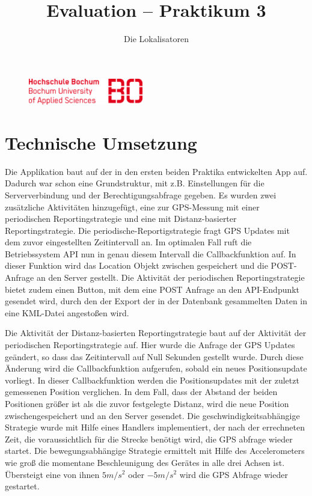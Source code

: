 

\title{Evaluation -- Praktikum 3}
\author{Die Lokalisatoren}

\ihead{}
\chead{}
\ohead{}
\ifoot{}
\cfoot{\pagemark}
\ofoot{}



\setlength{\parskip}{0em}
\setlength{\parindent}{0em}
\renewcommand{\baselinestretch}{1.5}



\begin{figure}[t]
	\flushright
	\includegraphics[width=5cm]{hs-bo-logo}
\end{figure}

\docheader

\section{Technische Umsetzung}
Die Applikation baut auf der in den ersten beiden Praktika entwickelten App auf. Dadurch war schon eine Grundstruktur, mit z.B. Einstellungen für die Serververbindung und der Berechtigungsabfrage gegeben.
Es wurden zwei zusätzliche Aktivitäten hinzugefügt, eine zur GPS-Messung mit einer periodischen Reportingstrategie und eine mit Distanz-basierter Reportingstrategie.
Die periodische-Reportigstrategie fragt GPS Updates mit dem zuvor eingestellten Zeitintervall an. Im optimalen Fall ruft die Betriebssystem API nun in genau diesem Intervall die Callbackfunktion auf. In dieser Funktion wird das Location Objekt zwischen gespeichert und die POST-Anfrage an den Server gestellt. Die Aktivität der periodischen Reportingstrategie bietet zudem einen Button, mit dem eine POST Anfrage an den API-Endpunkt gesendet wird, durch den der Export der in der Datenbank gesammelten Daten in eine KML-Datei angestoßen wird.

Die Aktivität der  Distanz-basierten Reportingstrategie baut auf der Aktivität der periodischen Reportingstrategie auf. Hier wurde die Anfrage der GPS Updates geändert, so dass das Zeitintervall auf Null Sekunden gestellt wurde. Durch diese Änderung wird die Callbackfunktion aufgerufen, sobald ein neues Positionsupdate vorliegt. In dieser Callbackfunktion werden die Positionsupdates mit der zuletzt gemessenen Position verglichen. In dem Fall, dass der Abstand der beiden Positionen größer ist als die zuvor festgelegte Distanz, wird die neue Position zwischengespeichert und an den Server gesendet.
Die geschwindigkeitsabhängige Strategie wurde mit Hilfe eines Handlers implementiert, der nach der errechneten Zeit, die voraussichtlich für die Strecke benötigt wird, die GPS abfrage wieder startet.
Die bewegungsabhängige Strategie ermittelt mit Hilfe des Accelerometers wie groß die momentane Beschleunigung des Gerätes in alle drei Achsen ist. Übersteigt eine von ihnen $5m/s^2$ oder $-5m/s^2$ wird die GPS Abfrage wieder gestartet.

